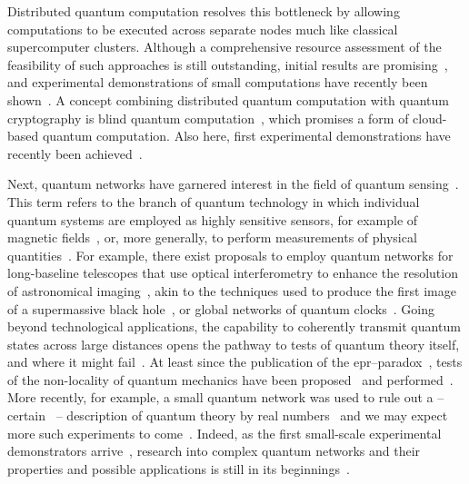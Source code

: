Distributed quantum computation resolves this bottleneck by allowing computations to be executed across separate nodes much like classical supercomputer clusters.
Although a comprehensive resource assessment of the feasibility of such approaches is still outstanding, initial results are promising~\cite{Jacinto2026}, and experimental demonstrations of small computations have recently been shown~\cite{Main2025}.
A concept combining distributed quantum computation with quantum cryptography is blind quantum computation~\cite{Childs2005,Giovannetti2013}, which promises a form of cloud-based quantum computation.
Also here, first experimental demonstrations have recently been achieved~\cite{Wei2025}.

Next, quantum networks have garnered interest in the field of quantum sensing~\cite{Eldredge2018}.
This term refers to the branch of quantum technology in which individual quantum systems are employed as highly sensitive sensors, for example of magnetic fields~\cite{Ockeloen2013,Clevenson2015}, or, more generally, to perform measurements of physical quantities~\cite{Giovannetti2004,Degen2017}.
For example, there exist proposals to employ quantum networks for long-baseline telescopes that use optical interferometry to enhance the resolution of astronomical imaging~\cite{Gottesman2012,Khabiboulline2019}, akin to the techniques used to produce the first image of a supermassive black hole~\cite{TheEventHorizonTelescopeCollaboration2019}, or global networks of quantum clocks~\cite{Komar2014}.
Going beyond technological applications, the capability to coherently transmit quantum states across large distances opens the pathway to tests of quantum theory itself, and where it might fail~\cite{Weinberg1989}.
At least since the publication of the \gls{epr}--paradox~\cite{Einstein1935}, tests of the non-locality of quantum mechanics have been proposed~\cite{Bell1964,Clauser1969} and performed~\cite{Hensen2015,Storz2023}.
More recently, for example, a small quantum network was used to rule out a -- certain~\cite{Hita2025} -- description of quantum theory by real numbers~\cite{Renou2021,Wu2022a,Li2022,Chen2022a} and we may expect more such experiments to come~\cite{Shadbolt2014}.
Indeed, as the first small-scale experimental demonstrators arrive~\cite{Knaut2024,Liu2024,Kucera2024,Stolk2024}, research into complex quantum networks and their properties and possible applications is still in its beginnings~\cite{Nokkala2024}.

